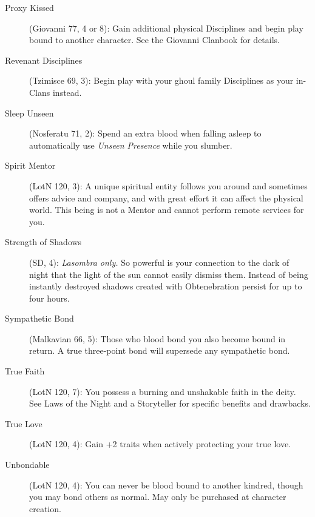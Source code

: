 \begin{description}
	\item[Proxy Kissed] (Giovanni 77, 4 or 8):  Gain additional physical Disciplines and begin play 
	bound to another character.  See the Giovanni Clanbook for details.
	\item[Revenant Disciplines] (Tzimisce 69, 3):  Begin play with your ghoul family Disciplines as 
	your in-Clans instead.
	\item[Sleep Unseen] (Nosferatu 71, 2):  Spend an extra blood when falling asleep to automatically 
	use \emph{Unseen Presence} while you slumber.
	\item[Spirit Mentor] (LotN 120, 3):  A unique spiritual entity follows you around and sometimes offers 
	advice and company, and with great effort it can affect the physical world.  This being is not a Mentor 
	and cannot perform remote services for you.
	\item[Strength of Shadows] (SD, 4):  \emph{Lasombra only.}  So powerful is your connection 
	to the dark of night that the light of the sun cannot easily dismiss them.  Instead of being instantly 
	destroyed shadows created with Obtenebration persist for up to four hours.
	\item[Sympathetic Bond] (Malkavian 66, 5):  Those who blood bond you also become bound in return.  
	A true three-point bond will supersede any sympathetic bond.
	\item[True Faith] (LotN 120, 7):  You possess a burning and unshakable faith in the deity.  See 
	Laws of the Night and a Storyteller for specific benefits and drawbacks.
	\item[True Love] (LotN 120, 4):  Gain +2 traits when actively protecting your true love.
	\item[Unbondable] (LotN 120, 4):  You can never be blood bound to another kindred, though you may 
	bond others as normal.  May only be purchased at character creation.
\end{description}

